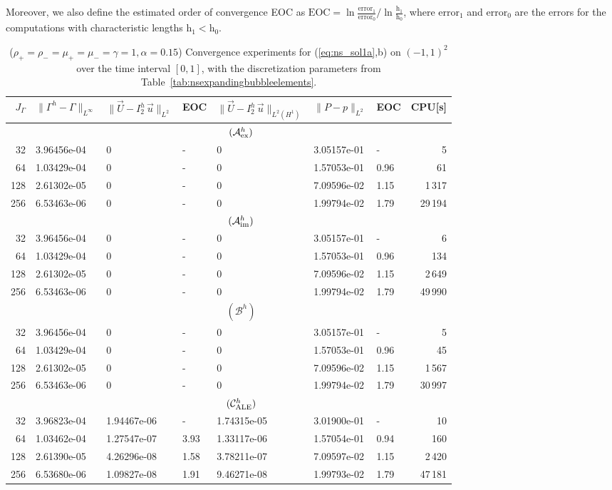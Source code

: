 \documentclass[a4paper,12pt,onecolumn]{article}
\newcommand{\errorXx}{\|\Gamma^h - \Gamma\|_{L^\infty}}
\newcommand{\LerrorUu}[1]{\|\vec U - I^h_{#1}\,\vec u\|_{L^2}}
\newcommand{\HerrorUu}[1]{\|\vec U - I^h_{#1}\,\vec u\|_{L^2(H^1)}}
\newcommand{\LerrorPp}{\|P - p\|_{L^2}}
\newcommand{\schemeAex}{{\mathcal{A}^h_{\rm ex}}}
\newcommand{\schemeAim}{{\mathcal{A}^h_{\rm im}}}
\newcommand{\schemeB}{{\mathcal{B}^h}}
\newcommand{\schemeALE}{{\mathcal{C}^h_{\rm ALE}}}
\begin{document}
Moreover, we also define the estimated order of convergence EOC as
$\mbox{EOC}={\ln{\frac{\mbox{error}_1}{\mbox{error}_0}}}/
{\ln{\frac{\mbox{h}_1}{\mbox{h}_0}}}$,
where $\mbox{error}_1$ and $\mbox{error}_0$ are the errors for the computations
with characteristic lengths $\mbox{h}_1 < \mbox{h}_0$.
\begin{table}
\center
\hspace*{-3.25cm}
\begin{tabular}{rllllllr}
\hline
$J_\Gamma$ & $\errorXx$ & $\LerrorUu2$ & EOC & $\HerrorUu2$ & $\LerrorPp$ & EOC
& CPU[s] \\
\hline
& \multicolumn{7}{c}{$(\schemeAex)$} \\
\hline
 32 & 3.96456e-04 & 0 & - & 0 & 3.05157e-01 &    - &     5 \\
 64 & 1.03429e-04 & 0 & - & 0 & 1.57053e-01 & 0.96 &    61 \\
128 & 2.61302e-05 & 0 & - & 0 & 7.09596e-02 & 1.15 &  1\,317 \\
256 & 6.53463e-06 & 0 & - & 0 & 1.99794e-02 & 1.79 & 29\,194 \\
\hline
& \multicolumn{7}{c}{$(\schemeAim)$} \\
\hline
 32 & 3.96456e-04 & 0 & - & 0 & 3.05157e-01 &    - &     6 \\
 64 & 1.03429e-04 & 0 & - & 0 & 1.57053e-01 & 0.96 &   134 \\
128 & 2.61302e-05 & 0 & - & 0 & 7.09596e-02 & 1.15 &  2\,649 \\
256 & 6.53463e-06 & 0 & - & 0 & 1.99794e-02 & 1.79 & 49\,990 \\
\hline
& \multicolumn{7}{c}{$(\schemeB)$} \\
\hline
 32 & 3.96456e-04 & 0 & - & 0 & 3.05157e-01 &    - &       5 \\
 64 & 1.03429e-04 & 0 & - & 0 & 1.57053e-01 & 0.96 &      45 \\
128 & 2.61302e-05 & 0 & - & 0 & 7.09596e-02 & 1.15 &  1\,567 \\
256 & 6.53463e-06 & 0 & - & 0 & 1.99794e-02 & 1.79 & 30\,997 \\
\hline
& \multicolumn{7}{c}{$(\schemeALE)$} \\
\hline
 32 & 3.96823e-04 & 1.94467e-06 &    - & 1.74315e-05 & 3.01900e-01 &    - &
10 \\
 64 & 1.03462e-04 & 1.27547e-07 & 3.93 & 1.33117e-06 & 1.57054e-01 & 0.94 &
160 \\
128 & 2.61390e-05 & 4.26296e-08 & 1.58 & 3.78211e-07 & 7.09597e-02 & 1.15 &
2\,420 \\
256 & 6.53680e-06 & 1.09827e-08 & 1.91 & 9.46271e-08 & 1.99793e-02 & 1.79 &
47\,181 \\
\hline
\end{tabular}
\hspace*{-3.25cm}
\caption[Navier--Stokes expanding bubble I errors]
{($\rho_+ = \rho_- = \mu_+ = \mu_- = \gamma = 1,\alpha=0.15$)
Convergence experiments for (\ref{eq:ns_sol1a},b)
on $(-1,1)^2$ over the time interval $[0,1]$, with the
discretization parameters from Table~\ref{tab:nsexpandingbubbleelements}.}
\label{tab:nsexpandingbubbleIp2p1p0}
\end{table}%
\end{document}
